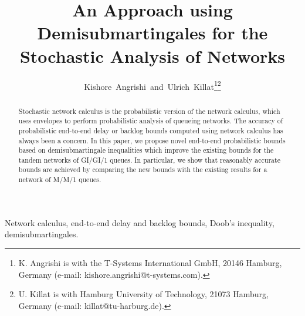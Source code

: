 \documentclass[letterpaper]{IEEEtran}
\begin{document}
\title{An Approach using Demisubmartingales for the Stochastic Analysis of Networks}


\author{Kishore~Angrishi~and~Ulrich~Killat\thanks{K. Angrishi is with the T-Systems International GmbH, 20146 Hamburg, Germany (e-mail: kishore.angrishi@t-systems.com).}\thanks{U. Killat is with Hamburg University of Technology, 21073 Hamburg, Germany (e-mail: killat@tu-harburg.de).}}














\maketitle


\begin{abstract}
Stochastic network calculus is the probabilistic version of the  network calculus, which uses envelopes to perform probabilistic analysis of queueing networks. The accuracy of probabilistic end-to-end delay or backlog bounds computed using network calculus has always been a concern. In this paper, we propose novel end-to-end probabilistic bounds based on demisubmartingale inequalities which improve the existing bounds for the tandem networks of GI/GI/1 queues. In particular, we show that reasonably accurate bounds are achieved by comparing the new bounds with the existing results for a network of M/M/1 queues.
\end{abstract}


\begin{IEEEkeywords}
Network calculus, end-to-end delay and backlog bounds, Doob's inequality, demisubmartingales. 
\end{IEEEkeywords}


\IEEEpeerreviewmaketitle
\end{document}
